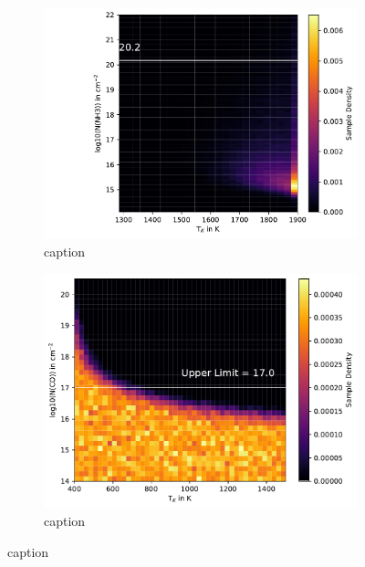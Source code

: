 \documentclass[oneside, single, authoryear, semicolon, 12pt]{lion-msc}
\newcommand{\4}{$_4$}
\newcommand{\3}{$_3$}
\newcommand{\2}{$_2$}
\begin{document}
\begin{figure}[!ht]
    \centering
    \begin{subfigure}[b]{0.49\textwidth}
        \centering
        \includegraphics[width=\textwidth]{radexpy_niels/Radexpy_for_Niels/upper_NH3_Sz98.pdf}
        \caption{caption}
    \end{subfigure}
    \hfill
    \begin{subfigure}[b]{0.49\textwidth}
        \centering
        \includegraphics[width=\textwidth]{upper_CO_Sz98.pdf}
        \caption{caption}
    \end{subfigure}
    \caption{caption}
\end{figure}
\end{document}
